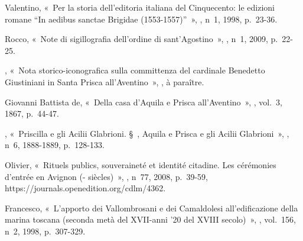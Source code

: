 \begin{teiElement}[name={TEI},change={commons\_edition}]
\begin{teiElement}[name={text},type={book},xmlid={book}]
\begin{teiElement}[name={group},type={book},xmlid={book-001}]
\begin{teiElement}[name={group},type={bibliography},data-page-title={Sources et bibliographie},data-include-href={Ch14\_Source\_bibliographie.xml},xmlid={bibliography-001}]
\begin{teiElement}[name={body}]
\begin{teiDiv}[type={section1},xmlid={div18}]
\begin{teiDiv}[type={section2},xmlid={div20}]
\begin{teiBibl}[xmlid={bibl-489}]
\end{teiBibl}
              \begin{teiBibl}[xmlid={bibl-490}]
 Valentino, « Per la storia dell’editoria italiana del Cinquecento: le edizioni romane “In aedibus sanctae Brigidae (1553-1557)” », , n 1, 1998, p. 23-36.
\end{teiBibl}
              \begin{teiBibl}[xmlid={bibl-491}]
 Rocco, « Note di sigillografia dell’ordine di sant’Agostino »,  , n 1, 2009, p. 22-25.
\end{teiBibl}
              \begin{teiBibl}[xmlid={bibl-492}]
, « Nota storico-iconografica sulla committenza del cardinale Benedetto Giustiniani in Santa Prisca all’Aventino », , à paraître.
\end{teiBibl}
              \begin{teiBibl}[xmlid={bibl-493}]
 Giovanni Battista de, « Della casa d’Aquila e Prisca all’Aventino », , vol. 3, 1867, p. 44-47.
\end{teiBibl}
              \begin{teiBibl}[xmlid={bibl-494}]
, « Priscilla e gli Acilii Glabrioni. § , Aquila e Prisca e gli Acilii Glabrioni », , n 6, 1888-1889, p. 128-133.
\end{teiBibl}
              \begin{teiBibl}[xmlid={bibl-495}]
 Olivier, « Rituels publics, souveraineté et identité citadine. Les cérémonies d’entrée en Avignon (- siècles) », , n 77, 2008, p. 39-59, https://journals.openedition.org/cdlm/4362.
\end{teiBibl}
              \begin{teiBibl}[xmlid={bibl-496}]
 Francesco, « L’apporto dei Vallombrosani e dei Camaldolesi all’edificazione della marina toscana (seconda metà del XVII-anni ’20 del XVIII secolo) », , vol. 156, n 2, 1998, p. 307-329.

\end{teiBibl}
\end{teiDiv}
\end{teiDiv}
\end{teiElement}
\end{teiElement}
\end{teiElement}
\end{teiElement}
\end{teiElement}

